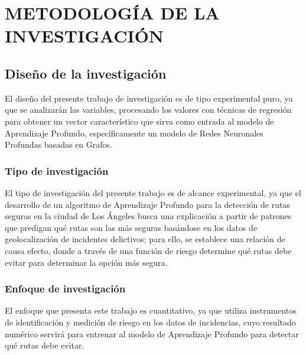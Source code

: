 \chapter{METODOLOGÍA DE LA INVESTIGACIÓN}
\section{Diseño de la investigación}
El diseño del presente trabajo de investigación es de tipo experimental puro, ya que se analizarán las variables, procesando los valores con técnicas de regresión para obtener un vector característico que sirva como entrada al modelo de Aprendizaje Profundo, específicamente un modelo de Redes Neuronales Profundas basadas en Grafos.
\subsection{Tipo de investigación}
El tipo de investigación del presente trabajo es de alcance experimental, ya que el desarrollo de un algoritmo de Aprendizaje Profundo para la detección de rutas seguras en la ciudad de Los Ángeles busca una explicación a partir de patrones que predigan qué rutas son las más seguras basándose en los datos de geolocalización de incidentes delictivos; para ello, se establece una relación de causa efecto, donde a través de una función de riesgo determine qué rutas debe evitar para determinar la opción más segura.


\subsection{Enfoque de investigación}
El enfoque que presenta este trabajo es cuantitativo, ya que utiliza instrumentos de identificación y medición de riesgo en los datos de incidencias, cuyo resultado numérico servirá para entrenar al modelo de Aprendizaje Profundo para detectar qué rutas debe evitar.
\medskip

